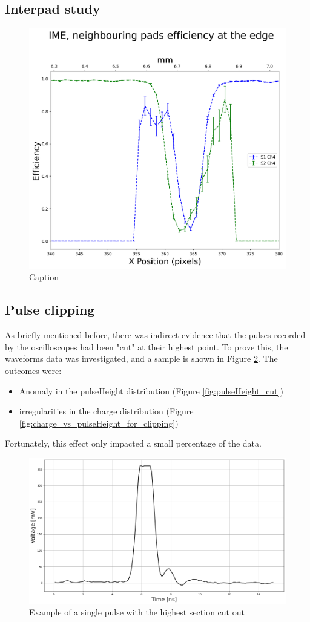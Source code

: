 \subsection{Interpad study}\label{sec:neighbouring_pads}
\begin{figure}[h!tbp]
    \centering
    \includegraphics[width=0.5\linewidth]{Images/detailed_analysis/batch 401 duts:3 and 3, edge efficiency studies.png}
    \captionsetup{width=\captionwidth}
    \caption{Caption}
    \label{fig:neighbouring_pads}
\end{figure}

\subsection{Pulse clipping}\label{sec:pulse_clipping}

As briefly mentioned before, there was indirect evidence that the pulses recorded by the oscilloscopes had been "cut" at their highest point. To prove this, the waveforms data was investigated, and a sample is shown in Figure \ref{fig:clipped_pulse}. The outcomes were:

\begin{itemize}
    \item Anomaly in the pulseHeight distribution (Figure \ref{fig:pulseHeight_cut})
    \item irregularities in the charge distribution (Figure \ref{fig:charge_vs_pulseHeight_for_clipping})
\end{itemize}
Fortunately, this effect only impacted a small percentage of the data.

\begin{figure}[h!tbp]
    \centering
    \includegraphics[width=.9\linewidth]{Images/detailed_analysis/Waveform of clipped pulse (ns).png}
    \captionsetup{width=\captionwidth}
    \caption{Example of a single pulse with the highest section cut out}
    \label{fig:clipped_pulse}
\end{figure}
 

